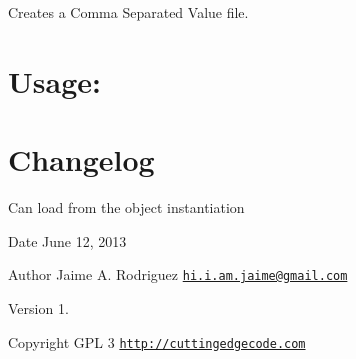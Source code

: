Creates a Comma Separated Value file.\hypertarget{robo1_usage}{}\section{Usage\-:}\label{robo1_usage}

\hypertarget{mailer1_changelog}{}\section{Changelog}\label{mailer1_changelog}

\begin{DoxyItemize}
\item Can load from the object instantiation
\end{DoxyItemize}

\begin{DoxyDate}{Date}
June 12, 2013 
\end{DoxyDate}
\begin{DoxyAuthor}{Author}
Jaime A. Rodriguez \href{mailto:hi.i.am.jaime@gmail.com}{\tt hi.\-i.\-am.\-jaime@gmail.\-com} 
\end{DoxyAuthor}
\begin{DoxyVersion}{Version}
1. 
\end{DoxyVersion}
\begin{DoxyCopyright}{Copyright}
G\-P\-L 3 \href{http://cuttingedgecode.com}{\tt http\-://cuttingedgecode.\-com} 
\end{DoxyCopyright}
